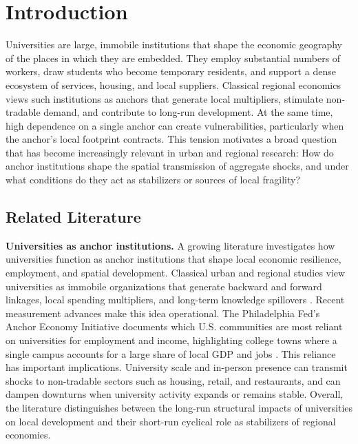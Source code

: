 
\section{ Introduction}

\noindent Universities are large, immobile institutions that shape the economic geography of the places in which they are embedded. They employ substantial numbers of workers, draw students who become temporary residents, and support a dense ecosystem of services, housing, and local suppliers. Classical regional economics views such institutions as anchors that generate local multipliers, stimulate non-tradable demand, and contribute to long-run development. At the same time, high dependence on a single anchor can create vulnerabilities, particularly when the anchor’s local footprint contracts. This tension motivates a broad question that has become increasingly relevant in urban and regional research: How do anchor institutions shape the spatial transmission of aggregate shocks, and under what conditions do they act as stabilizers or sources of local fragility?

\subsection{ Related Literature}
\noindent \textbf{Universities as anchor institutions.} A growing literature investigates how universities function as anchor institutions that shape local economic resilience, employment, and spatial development. Classical urban and regional studies view universities as immobile organizations that generate backward and forward linkages, local spending multipliers, and long-term knowledge spillovers \citep{Saxenian1996RegionalAdvantage,felsensteinUniversityMetropolitanArena1996}. Recent measurement advances make this idea operational. The Philadelphia Fed’s Anchor Economy Initiative documents which U.S. communities are most reliant on universities for employment and income, highlighting college towns where a single campus accounts for a large share of local GDP and jobs \citep{Harker2024AnchorReliance}. This reliance has important implications. University scale and in-person presence can transmit shocks to non-tradable sectors such as housing, retail, and restaurants, and can dampen downturns when university activity expands or remains stable. Overall, the literature distinguishes between the long-run structural impacts of universities on local development and their short-run cyclical role as stabilizers of regional economies.


